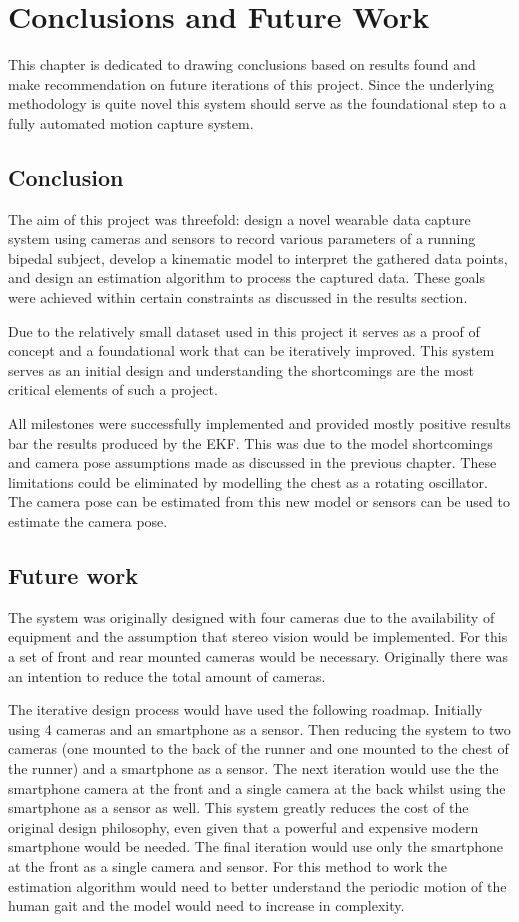 \chapter{Conclusions and Future Work}
This chapter is dedicated to drawing conclusions based on results found and make recommendation on future iterations of this project. Since the underlying methodology is quite novel this system should serve as the foundational step to a fully automated motion capture system.

\section{Conclusion}
The aim of this project was threefold: design a novel wearable data capture system using cameras and sensors to record various parameters of a running bipedal subject, develop a kinematic model to interpret the gathered data points, and design an estimation algorithm to process the captured data. These goals were achieved within certain constraints as discussed in the results section.

Due to the relatively small dataset used in this project it serves as a proof of concept and a foundational work that can be iteratively improved. This system serves as an initial design and understanding the shortcomings are the most critical elements of such a project.

All milestones were successfully implemented and provided mostly positive results bar the results produced by the EKF. This was due to the model shortcomings and camera pose assumptions made as discussed in the previous chapter. These limitations could be eliminated by modelling the chest as a rotating oscillator. The camera pose can be estimated from this new model or sensors can be used to estimate the camera pose. 

\section{Future work}
The system was originally designed with four cameras due to the availability of equipment and the assumption that stereo vision would be implemented. For this a set of front and rear mounted cameras would be necessary. Originally there was an intention to reduce the total amount of cameras.

The iterative design process would have used the following roadmap. Initially using 4 cameras and an smartphone as a sensor. Then reducing the system to two cameras (one mounted to the back of the runner and one mounted to the chest of the runner) and a smartphone as a sensor. The next iteration would use the the smartphone camera at the front and a single camera at the back whilst using the smartphone as a sensor as well. This system greatly reduces the cost of the original design philosophy, even given that a powerful and expensive modern smartphone would be needed. The final iteration would use only the smartphone at the front as a single camera and sensor. For this method to work the estimation algorithm would need to better understand the periodic motion of the human gait and the model would need to increase in complexity.

